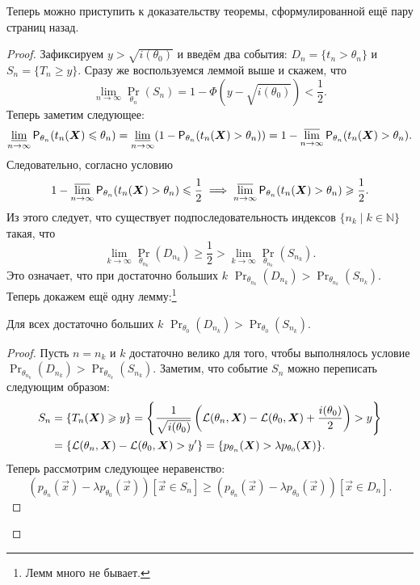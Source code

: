 Теперь можно приступить к доказательству теоремы, сформулированной ещё пару страниц назад.
\begin{proof}
    Зафиксируем $y > \sqrt{i(\theta_{0})}$ и введём два события: $D_{n} = \{t_{n} > \theta_{n}\}$ и $S_{n} = \{T_{n} \geq y\}$. Сразу же воспользуемся леммой выше и скажем, что
    \[
        \lim_{n \to \infty} \Pr_{\theta_{n}}(S_{n}) = 1 - \Phi(y - \sqrt{i(\theta_{0})}) < \frac{1}{2}.
    \]
    Теперь заметим следующее:
    \[
        \varliminf_{n \to \infty} \Pr_{\theta_{n}}(t_{n}(\vec{X}) \leq \theta_{n}) = \varliminf_{n \to \infty} (1 - \Pr_{\theta_{n}}(t_{n}(\vec{X}) > \theta_{n})) = 1 - \varlimsup_{n \to \infty} \Pr_{\theta_{n}}(t_{n}(\vec{X}) > \theta_{n}).
    \]
    Следовательно, согласно условию
    \[
        1 - \varlimsup_{n \to \infty} \Pr_{\theta_{n}}(t_{n}(\vec{X}) > \theta_{n}) \leq \frac{1}{2} \implies \varlimsup_{n \to \infty} \Pr_{\theta_{n}}(t_{n}(\vec{X}) > \theta_{n}) \geq \frac{1}{2}.
    \]
    Из этого следует, что существует подпоследовательность индексов $\{n_{k} \mid k \in \mathbb{N}\}$ такая, что
    \[
        \lim\limits_{k \to \infty} \Pr_{\theta_{n_{k}}}(D_{n_{k}}) \geq \frac{1}{2} > \lim\limits_{k \to \infty} \Pr_{\theta_{n_{k}}}(S_{n_{k}}).
    \]
    Это означает, что при достаточно больших $k$ $\Pr_{\theta_{n_{k}}}(D_{n_{k}}) > \Pr_{\theta_{n_{k}}}(S_{n_{k}})$. Теперь докажем ещё одну лемму:\footnote{Лемм много не бывает.}
    \begin{lemma}
        Для всех достаточно больших $k$ $\Pr_{\theta_{0}}(D_{n_{k}}) > \Pr_{\theta_{0}}(S_{n_{k}})$.
    \end{lemma}
    \begin{proof}
        Пусть $n = n_{k}$ и $k$ достаточно велико для того, чтобы выполнялось условие $\Pr_{\theta_{n_{k}}}(D_{n_{k}}) > \Pr_{\theta_{n_{k}}}(S_{n_{k}})$. Заметим, что событие $S_{n}$ можно переписать следующим образом:
        \begin{align*}
            S_{n}
            &= \left\{T_{n}(\vec{X}) \geq y\right\}
            = \left\{\frac{1}{\sqrt{i(\theta_{0})}}\left(\Ell(\theta_{n}, \vec{X}) - \Ell(\theta_{0}, \vec{X}) + \frac{i(\theta_{0})}{2}\right) > y\right\} \\
            &= \left\{\Ell(\theta_{n}, \vec{X}) - \Ell(\theta_{0}, \vec{X}) > y'\right\}
            = \{p_{\theta_{n}}(\vec{X}) > \lambda p_{\theta_{0}}(\vec{X})\}.
        \end{align*}
        Теперь рассмотрим следующее неравенство:
        \[
            (p_{\theta_{n}}(\vec{x}) - \lambda p_{\theta_{0}}(\vec{x}))[\vec{x} \in S_{n}] \geq (p_{\theta_{n}}(\vec{x}) - \lambda p_{\theta_{0}}(\vec{x}))[\vec{x} \in D_{n}].
\]
\end{proof}
\end{proof}
